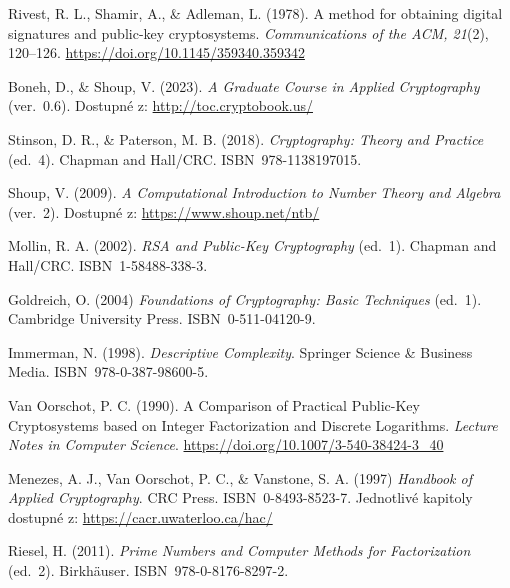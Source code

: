\documentclass[
  program=infoi,
  biblatex=false,
  figures=true,
  glossaries,
  tables=false,
  sourcecodes=true,
  index
]{kidiplom}
\begin{document}
\begin{thebibliography}{99}


        Rivest, R. L., Shamir, A., \& Adleman, L. (1978).
        A method for obtaining digital signatures and public-key cryptosystems.
        \emph{Communications of the ACM, 21}(2), 120–126.
        \url{https://doi.org/10.1145/359340.359342}

        Boneh, D., \& Shoup, V. (2023).
        \emph{A Graduate Course in Applied Cryptography} (ver.~0.6).
        Dostupné z: \url{http://toc.cryptobook.us/}

        Stinson, D. R., \& Paterson, M. B. (2018).
        \emph{Cryptography: Theory and Practice} (ed.~4).
        Chapman and Hall/CRC.
        ISBN~978-1138197015.

        Shoup, V. (2009).
        \emph{A Computational Introduction to Number Theory and Algebra} (ver.~2).
        Dostupné z: \url{https://www.shoup.net/ntb/}

        Mollin, R. A. (2002).
        \emph{RSA and Public-Key Cryptography} (ed.~1).
        Chapman and Hall/CRC.
        ISBN~1-58488-338-3.

        Goldreich, O. (2004)
        \emph{Foundations of Cryptography: Basic Techniques} (ed.~1).
        Cambridge University Press.
        ISBN~0-511-04120-9.

        Immerman, N. (1998).
        \emph{Descriptive Complexity}.
        Springer Science \& Business Media.
        ISBN~978-0-387-98600-5.

        Van Oorschot, P. C. (1990).
        A Comparison of Practical Public-Key Cryptosystems based on Integer Factorization and Discrete Logarithms.
        \emph{Lecture Notes in Computer Science}.
        \url{https://doi.org/10.1007/3-540-38424-3_40}

        Menezes, A. J., Van Oorschot, P. C., \& Vanstone, S. A. (1997)
        \emph{Handbook of Applied Cryptography}.
        CRC Press.
        ISBN~0-8493-8523-7.
        Jednotlivé kapitoly dostupné z: \url{https://cacr.uwaterloo.ca/hac/}

        Riesel, H. (2011).
        \emph{Prime Numbers and Computer Methods for Factorization} (ed.~2).
        Birkhäuser.
        ISBN~978-0-8176-8297-2.


\end{thebibliography}
\end{document}
